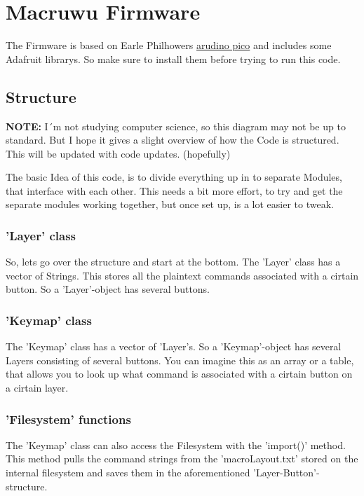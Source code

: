 \documentclass[english, 12pt]{scrartcl}
\begin{document}
	\section{Macruwu Firmware}
	The Firmware is based on Earle Philhowers \href{https://github.com/earlephilhower/arduino-pico}{arudino pico} and includes some Adafruit librarys. So make sure to install them before trying to run this code.
	\subsection{Structure}
	\textbf{NOTE:} I´m not studying computer science, so this diagram may not be up to standard. But I hope it gives a slight overview of how the Code is structured. This will be updated with code updates. (hopefully)\newline
	\begin{minipage}{\linewidth}
		\centering
		\resizebox{0.5\textheight}{!}{}
	\end{minipage}
	\newline
	\newline
	The basic Idea of this code, is to divide everything up in to separate Modules, that interface with each other. This needs a bit more effort, to try and get the separate modules working together, but once set up, is a lot easier to tweak.
	\subsubsection{'Layer' class}
	So, lets go over the structure and start at the bottom. The 'Layer' class has a vector of Strings. This stores all the plaintext commands associated with a cirtain button. So a 'Layer'-object has several buttons.
	\subsubsection{'Keymap' class}
	The 'Keymap' class has a vector of 'Layer's. So a 'Keymap'-object has several Layers consisting of several buttons. You can imagine this as an array or a table, that allows you to look up what command is associated with a cirtain button on a cirtain layer.
	\subsubsection{'Filesystem' functions}
	The 'Keymap' class can also access the Filesystem with the 'import()' method. This method pulls the command strings from the 'macroLayout.txt' stored on the internal filesystem and saves them in the aforementioned 'Layer-Button'-structure.
\end{document}
